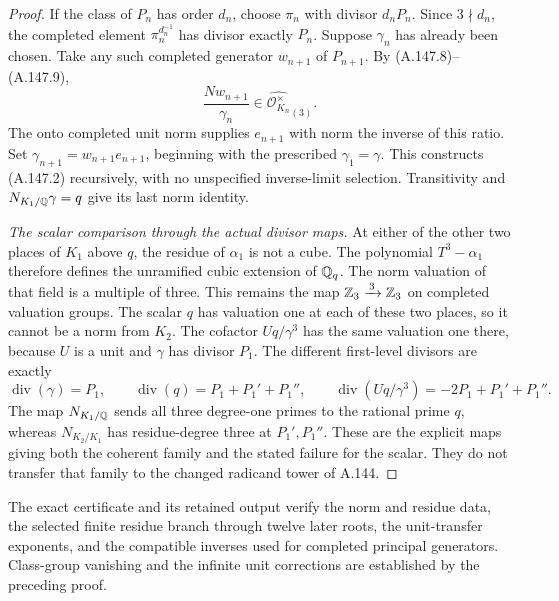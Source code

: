 \begin{proof}
If the class of \(P_n\) has order \(d_n\), choose
\(\pi_n\) with divisor \(d_nP_n\).
Since \(3\nmid d_n\), the completed element
\(\pi_n^{d_n^{-1}}\) has divisor exactly \(P_n\).
Suppose \(\gamma_n\) has already been chosen.
Take any such completed generator \(w_{n+1}\) of
\(P_{n+1}\).
By (A.147.8)--(A.147.9),
\[
       \frac{Nw_{n+1}}{\gamma_n}
                     \in\widehat{\mathcal O_{K_n}^\times}_{(3)}.
\tag{A.147.10}
\]
The onto completed unit norm supplies
\(e_{n+1}\) with norm the inverse of this ratio.
Set \(\gamma_{n+1}=w_{n+1}e_{n+1}\), beginning with
the prescribed \(\gamma_1=\gamma\).
This constructs (A.147.2) recursively, with no
unspecified inverse-limit selection.
Transitivity and \(N_{K_1/\mathbb Q}\gamma=q\) give its
last norm identity.

\emph{The scalar comparison through the actual divisor maps.}
At either of the other two places of \(K_1\) above
\(q\), the residue of \(\alpha_1\) is not a cube.
The polynomial \(T^3-\alpha_1\) therefore defines
the unramified cubic extension of \(\mathbb Q_q\).
The norm valuation of that field is a multiple of
three.  This remains the map
\(\mathbb Z_3\xrightarrow{\,3\,}\mathbb Z_3\) on completed
valuation groups.
The scalar \(q\) has valuation one at each of these
two places, so it cannot be a norm from \(K_2\).
The cofactor \(Uq/\gamma^3\) has the same valuation
one there, because \(U\) is a unit and \(\gamma\)
has divisor \(P_1\).
The different first-level divisors are exactly
\[
 \operatorname{div}(\gamma)=P_1,
 \qquad
 \operatorname{div}(q)=P_1+P_1'+P_1'',
 \qquad
 \operatorname{div}(Uq/\gamma^3)
                   =-2P_1+P_1'+P_1''.
\tag{A.147.11}
\]
The map \(N_{K_1/\mathbb Q}\) sends all three degree-one
primes to the rational prime \(q\), whereas
\(N_{K_2/K_1}\) has residue-degree three at
\(P_1',P_1''\).
These are the explicit maps giving both the coherent
family and the stated failure for the scalar.
They do not transfer that family to the changed
radicand tower of A.144.
\end{proof}

The exact certificate
and its retained output verify the norm and residue
data, the selected finite residue branch through
twelve later roots, the unit-transfer exponents,
and the compatible inverses used for completed
principal generators.  Class-group vanishing and
the infinite unit corrections are established by
the preceding proof.
